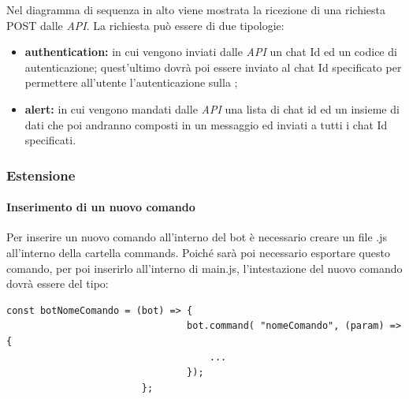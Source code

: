 	Nel diagramma di sequenza in alto viene mostrata la ricezione di una richiesta POST dalle \textit{API}. La richiesta può essere di due tipologie: 
	\begin{itemize}
		\item \textbf{authentication:} in cui vengono inviati dalle \textit{API} un chat Id ed un codice di autenticazione; quest'ultimo dovrà poi essere inviato al chat Id specificato per permettere all'utente l'autenticazione sulla ;
		\item \textbf{alert:} in cui vengono mandati dalle \textit{API} una lista di chat id ed un insieme di dati che poi andranno composti in un messaggio ed inviati a tutti i chat Id specificati.
	\end{itemize}
\subsubsection{Estensione}
	\paragraph{Inserimento di un nuovo comando}
		Per inserire un nuovo comando all'interno del bot è necessario creare un file .js all'interno della cartella commands.
		\newline
		Poiché sarà poi necessario esportare questo comando, per poi inserirlo all'interno di main.js, l'intestazione del nuovo comando dovrà essere del tipo:
		\begin{verbatim}const botNomeComando = (bot) => {
								bot.command( "nomeComando", (param) => {
							 		...
							 	});
						}; 
		\end{verbatim}	